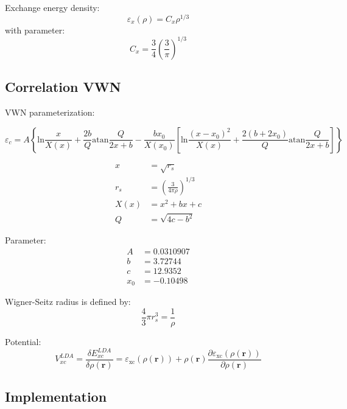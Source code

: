 Exchange energy density:
\begin{equation}
\varepsilon_{x}(\rho) = C_{x}\rho^{1/3}
\end{equation}
with parameter:
\begin{equation}
C_{x} = \frac{3}{4}\left(\frac{3}{\pi}\right)^{1/3}  
\end{equation}


\subsection{Correlation VWN}

VWN parameterization:
\begin{fullwidth}
\begin{equation}
\varepsilon_{c} = A \left\{
\mathrm{ln}\frac{x}{X(x)} + \frac{2b}{Q}\mathrm{atan}\frac{Q}{2x+b}
- \frac{bx_{0}}{X(x_{0})}\left[
\mathrm{ln}\frac{(x - x_0)^2}{X(x)} + \frac{2(b + 2x_0)}{Q}\mathrm{atan}\frac{Q}{2x + b}
\right]
\right\}
\end{equation}
\end{fullwidth}

\begin{align}
x & = \sqrt{r_{s}} \\
r_s & = \left( \frac{3}{4\pi\rho} \right)^{1/3} \\
X(x) & = x^2 + bx + c \\
Q & = \sqrt{4c - b^2}
\end{align}

Parameter:
\begin{align}
A & = 0.0310907 \\
b & = 3.72744 \\
c & = 12.9352 \\
x_0 & = -0.10498
\end{align}

Wigner-Seitz radius is defined by:
\begin{equation}
\frac{4}{3}\pi r^{3}_{s} = \frac{1}{\rho}
\end{equation}

Potential:
\begin{equation}
V^{LDA}_{xc} = \frac{\delta E^{LDA}_{xc}}{\delta \rho(\mathbf{r})} = 
\varepsilon_{\mathrm{xc}}( \rho(\mathbf{r}) ) + \rho(\mathbf{r})
\frac{\partial \varepsilon_{\mathrm{xc}}( \rho(\mathbf{r}) )}{\partial\rho(\mathbf{r})}
\end{equation}


\subsection{Implementation}

